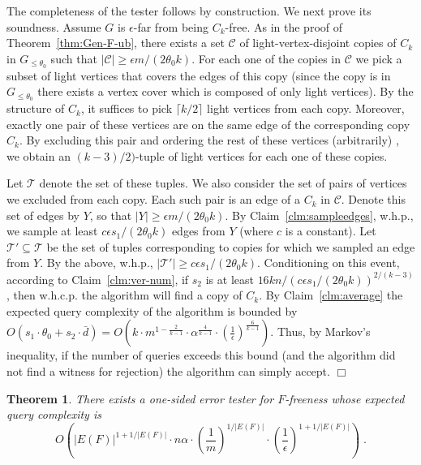 \documentclass{article}
\newcommand{\calC}{{\mathcal{C}}}
\newcommand{\calT}{{\mathcal{T}}}
\newenvironment{proof}{\smallskip\noindent{\bf Proof:}}%
        {\hspace*{\fill}$\Box$\par}
\newtheorem{theorem}{Theorem}
\newcommand{\commentt}[1]{ {}}
\begin{document}
\begin{proof}
The completeness of the tester follows by construction. %
We next prove its soundness. Assume $G$ is $\epsilon$-far from being $C_k$-free.
As in the proof of Theorem~\ref{thm:Gen-F-ub}, there exists a set $\calC$ of light-vertex-disjoint copies of $C_k$ in $G_{\leq \theta_0}$ such that $|\calC|\geq \epsilon m/ (2\theta_0 k)$.
For each one of the copies in $\calC$ we pick a subset of light vertices that covers the edges of this copy (since the copy is in $G_{\leq \theta_0}$ there exists a vertex cover which is composed of only light vertices).
By the structure of $C_k$, it suffices to pick $\lceil k/2 \rceil$ light vertices from each copy.
Moreover, exactly one pair of these vertices are on the same edge of the corresponding copy $C_k$.
By excluding this pair and ordering the rest of these vertices (arbitrarily) , we obtain an $(k-3)/2)$-tuple of light vertices for each one of these copies.

Let $\calT$ denote the set of these tuples.
We also consider the set of pairs of vertices we excluded from each copy.
Each such pair is an edge of a $C_k$ in $\calC$.
Denote this set of edges by $Y$, so that
$|Y| \geq \epsilon m/ (2\theta_0 k)$.
By Claim~\ref{clm:sampleedges}, w.h.p., we sample at least $c \epsilon s_1/ (2\theta_0 k) $ edges from $Y$ (where $c$ is a constant).
Let $\calT' \subseteq \calT$ be the set of tuples corresponding to copies for which we sampled an edge from $Y$.
By the above, w.h.p., $|\calT'| \geq c \epsilon s_1/ (2\theta_0 k) $.
Conditioning on this event, according to Claim~\ref{clm:ver-num}, if $s_2$ is at least $16 k n / (c \epsilon s_1/ (2\theta_0 k))^{2/(k-3)}$, then w.h.c.p. the algorithm will find a copy of $C_k$.
By Claim~\ref{clm:average} the expected query complexity of the algorithm is bounded by $O(s_1 \cdot \theta_0 + s_2 \cdot \bar{d}) = O\left(k \cdot m^{1- \frac{2}{k-1}} \cdot \alpha^{\frac{4}{k-1}} \cdot \left( \frac{1}{\epsilon}\right)^{\frac{6}{k-1}} \right)$. Thus, by Markov's inequality, if the number of queries exceeds this bound (and the algorithm did not find a witness for rejection) the algorithm can simply accept. 
\end{proof}

\iffalse
\begin{theorem}\label{thm:Gen-F-ub2}
There exists a one-sided error tester for $F$-freeness whose expected query complexity is $$O\left(|E(F)|^{1+1/|E(F)|} \cdot n\alpha \cdot \left(\frac{1}{m }\right)^{1/|E(F)|} \cdot \left(\frac{1}{\epsilon}\right)^{1+1/|E(F)|}\right)\;.$$
\end{theorem}
\end{document}
